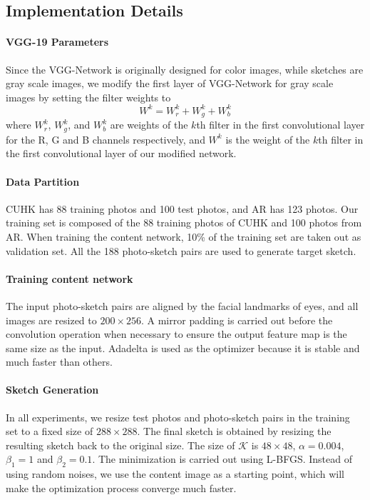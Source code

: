 \documentclass[10pt,twocolumn,letterpaper]{article}
\begin{document}
\subsection{Implementation Details}

\paragraph*{VGG-19 Parameters} Since the VGG-Network is originally designed for color images, while sketches are gray scale images, we modify the first layer of VGG-Network for gray scale images by setting the filter weights to
\begin{equation}
W^{k} = W^{k}_r+W^{k}_g+W^{k}_b
\label{eq:VGG_weights}
\end{equation}
where $W^{k}_r$, $W^{k}_g$, and $W^{k}_b$ are weights of the $k$th filter in the first convolutional layer for the R, G and B channels respectively, and $W^{k}$ is the weight of the $k$th filter in the first convolutional layer of our modified network.

\paragraph{Data Partition} CUHK has 88 training photos and 100 test photos, and AR has 123 photos. Our training set is composed of the 88 training photos of CUHK and 100 photos from AR. When training the content network, 10\% of the training set are taken out as validation set. All the 188 photo-sketch pairs are used to generate target sketch.

\paragraph{Training content network} The input photo-sketch pairs are aligned by the facial landmarks of eyes, and all images are resized to $200\times256$. A mirror padding is carried out before the convolution operation when necessary to ensure the output feature map is the same size as the input. Adadelta \cite{matt2012adadelta} is used as the optimizer because it is stable and much faster than others.  

\paragraph{Sketch Generation} 
In all experiments, we resize test photos and photo-sketch pairs in the training set to a fixed size of $288\times288$. The final sketch is obtained by resizing the resulting sketch back to the original size. The size of $\mathcal{K}$ is $48\times48$, $\alpha=0.004$, $\beta_1=1$ and $\beta_2=0.1$. The minimization is carried out using L-BFGS. Instead of using random noises, we use the content image as a starting point, which will make the optimization process converge much faster. 
\end{document}
